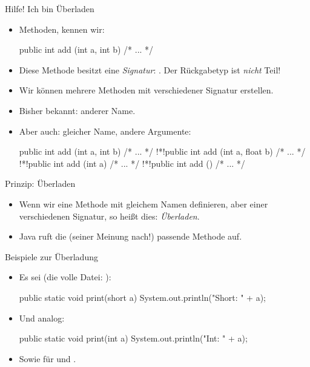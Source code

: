 \begin{frame}[t,fragile]{Hilfe! Ich bin Überladen}
    \begin{itemize}[<+(1)->]
        \item Methoden,\pause{} kennen wir: \pause{}
\begin{java*}
public int add (int a, int b) { /* ... */ }
\end{java*}
        \item Diese Methode besitzt eine \emph{Signatur}:\pause{} .
            Der Rückgabetyp ist \emph{nicht} Teil!
        \item Wir können mehrere Methoden mit verschiedener Signatur erstellen.
        \item Bisher bekannt: anderer Name.
        \item Aber auch: gleicher Name, andere Argumente:\pause{}
\begin{java*}
public int add (int a, int b) { /* ... */ }
!*\pause*!public int add (int a, float b) { /* ... */ }
!*\pause*!public int add (int a) { /* ... */ }
!*\pause*!public int add () { /* ... */ }
\end{java*}
    \end{itemize}
\end{frame}

\begin{frame}[t,fragile]{Prinzip: Überladen}
    \begin{itemize}[<+(1)->]
        \item Wenn wir eine Methode mit gleichem Namen definieren,\pause{}
             aber einer verschiedenen Signatur,\pause{} so heißt dies: \emph{Überladen}.
        \item Java ruft die (seiner Meinung nach!) passende Methode auf.
    \end{itemize}
\end{frame}

\begin{frame}[t,fragile]{Beispiele zur Überladung}
    \begin{itemize}[<+->]
        \item Es sei (die volle Datei: ):\pause{}
\begin{java}
public static void print(short a)   {
    System.out.println("Short: " + a);
}
\end{java}

        \item Und analog:\pause{}
\begin{java}
public static void print(int a)   {
    System.out.println("Int: " + a);
}
\end{java}
        \item Sowie für  und .
    \end{itemize}
\end{frame}

